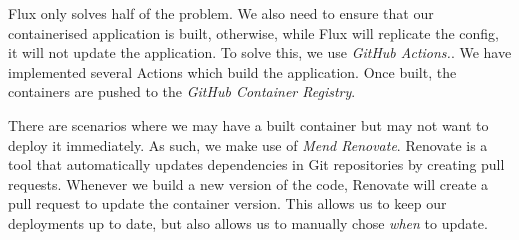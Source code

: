 \noindent{}Flux only solves half of the problem. We also need to ensure that our
containerised application is built, otherwise, while Flux will replicate the
config, it will not update the application. To solve this, we use \textit{GitHub
Actions.}. We have implemented several Actions which build the application. Once
built, the containers are pushed to the \textit{GitHub Container Registry}.

\noindent{}There are scenarios where we may have a built container but may not
want to deploy it immediately. As such, we make use of \textit{Mend Renovate}.
Renovate is a tool that automatically updates dependencies in Git repositories
by creating pull requests. Whenever we build a new version of the code, Renovate
will create a pull request to update the container version. This allows us to
keep our deployments up to date, but also allows us to manually chose
\textit{when} to update.